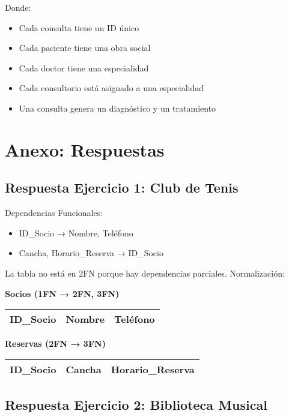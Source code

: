 \documentclass[12pt]{article}
\begin{document}
\vspace{1em}
Donde:
\begin{itemize}
    \item Cada consulta tiene un ID único
    \item Cada paciente tiene una obra social
    \item Cada doctor tiene una especialidad
    \item Cada consultorio está asignado a una especialidad
    \item Una consulta genera un diagnóstico y un tratamiento
\end{itemize}

\newpage

\section{Anexo: Respuestas}

\subsection{Respuesta Ejercicio 1: Club de Tenis}

Dependencias Funcionales:
\begin{itemize}
    \item ID\_Socio → Nombre, Teléfono
    \item Cancha, Horario\_Reserva → ID\_Socio
\end{itemize}

La tabla no está en 2FN porque hay dependencias parciales. Normalización:

\textbf{Socios (1FN → 2FN, 3FN)}
\begin{center}
\begin{tabular}{|l|l|l|}
\hline
ID\_Socio & Nombre & Teléfono \\
\hline
\end{tabular}
\end{center}

\textbf{Reservas (2FN → 3FN)}
\begin{center}
\begin{tabular}{|l|l|l|}
\hline
ID\_Socio & Cancha & Horario\_Reserva \\
\hline
\end{tabular}
\end{center}

\subsection{Respuesta Ejercicio 2: Biblioteca Musical}
\end{document}
